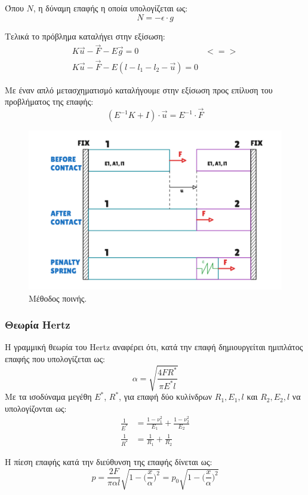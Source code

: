 \documentclass{article}
\begin{document}
Όπου $N$, η δύναμη επαφής η οποία υπολογίζεται ως:
\begin{equation}
    N = -\epsilon \cdot g
\end{equation}

Τελικά το πρόβλημα καταλήγει στην εξίσωση:
\begin{align}
    K\vec{u} - \vec{F} - E\vec{g} = 0 & <=>\\
    K\vec{u} - \vec{F} - E(l - l_1 - l_2 - \vec{u}) = 0&
\end{align}

Με έναν απλό μετασχηματισμό καταλήγουμε στην εξίσωση προς επίλυση του προβλήματος της επαφής:
\begin{equation}
    (E^{-1} K + I)\cdot \vec{u} = E^{-1}\cdot \vec{F}
\end{equation}

\begin{figure}[H]
    \centering
    \includegraphics[width=0.6\linewidth]{media/pen.png}
    \caption{Μέθοδος ποινής.}
    \label{fig:pen}
\end{figure}



\subsubsection{Θεωρία Hertz}
Η γραμμική θεωρία του Hertz αναφέρει ότι, κατά την επαφή δημιουργείται ημιπλάτος επαφής που υπολογίζεται ως:
\begin{equation}
    \alpha = \sqrt{\frac{4 F R^*}{\pi E^* l}}
\end{equation}
Με τα ισοδύναμα μεγέθη $Ε^*$, $R^*$, για επαφή δύο κυλίνδρων $R_1, E_1, l$ και $R_2, E_2, l$ να υπολογίζονται ως:
\begin{align}
    \frac{1}{E^*} & = \frac{1-\nu_1^2}{E_1} + \frac{1-\nu_2^2}{E_2} \\
    \frac{1}{R^*} &= \frac{1}{R_1} + \frac{1}{R_2} 
\end{align}

Η πίεση επαφής κατά την διεύθυνση της επαφής δίνεται ως:
\begin{equation}
    p = \frac{2F}{\pi \alpha l} \sqrt{1 - \bigg(\frac{x}{\alpha}\bigg)^2} = p_0\sqrt{1 - \bigg(\frac{x}{\alpha}\bigg)^2}
\end{equation}
\end{document}
